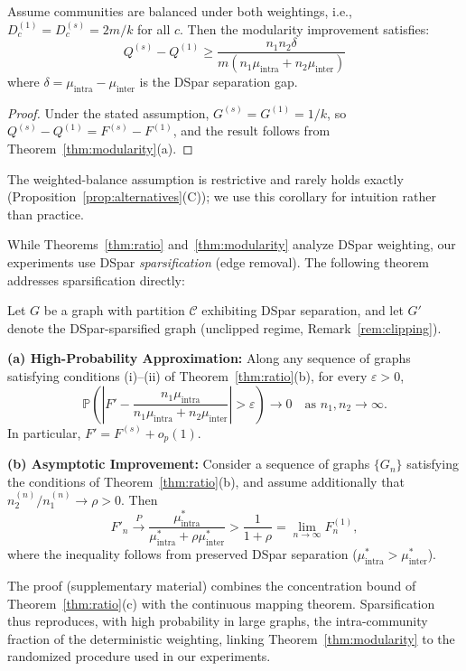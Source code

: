 \begin{corollary}
Assume communities are balanced under both weightings, i.e., $D_c^{(1)} = D_c^{(s)} = 2m/k$ for all $c$. Then the modularity improvement satisfies:
\begin{equation}
Q^{(s)} - Q^{(1)} \geq \frac{n_1 n_2 \delta}{m(n_1 \mu_{\text{intra}} + n_2 \mu_{\text{inter}})}
\end{equation}
where $\delta = \mu_{\text{intra}} - \mu_{\text{inter}}$ is the DSpar separation gap.
\end{corollary}

\begin{proof}
Under the stated assumption, $G^{(s)} = G^{(1)} = 1/k$, so $Q^{(s)} - Q^{(1)} = F^{(s)} - F^{(1)}$, and the result follows from Theorem~\ref{thm:modularity}(a).
\end{proof}

\noindent The weighted-balance assumption is restrictive and rarely holds exactly (Proposition~\ref{prop:alternatives}(C)); we use this corollary for intuition rather than practice.

While Theorems~\ref{thm:ratio} and~\ref{thm:modularity} analyze DSpar weighting, our experiments use DSpar \emph{sparsification} (edge removal). The following theorem addresses sparsification directly:

\begin{theorem}
\label{thm:sparsification}
Let $G$ be a graph with partition $\mathcal{C}$ exhibiting DSpar separation, and
let $G'$ denote the DSpar-sparsified graph (unclipped regime, Remark~\ref{rem:clipping}).

\textbf{(a) High-Probability Approximation:}
Along any sequence of graphs satisfying conditions (i)--(ii) of Theorem~\ref{thm:ratio}(b), for every $\varepsilon > 0$,
\begin{equation}
\mathbb{P}\!\left(
\left| F' -
\frac{n_1 \mu_{\text{intra}}}{n_1 \mu_{\text{intra}} + n_2 \mu_{\text{inter}}}
\right| > \varepsilon
\right) \longrightarrow 0 \quad \text{as } n_1, n_2 \to \infty.
\end{equation}
In particular, $F' = F^{(s)} + o_p(1)$.

\textbf{(b) Asymptotic Improvement:}
Consider a sequence of graphs $\{G_n\}$ satisfying the conditions of
Theorem~\ref{thm:ratio}(b), and assume additionally that
$n_2^{(n)}/n_1^{(n)} \to \rho > 0$. Then
\begin{equation}
F'_n \xrightarrow{P}
\frac{\mu_{\text{intra}}^*}{\mu_{\text{intra}}^* + \rho \mu_{\text{inter}}^*}
>
\frac{1}{1+\rho}
= \lim_{n \to \infty} F^{(1)}_n,
\end{equation}
where the inequality follows from preserved DSpar separation
($\mu_{\text{intra}}^* > \mu_{\text{inter}}^*$).
\end{theorem}

\noindent The proof (supplementary material) combines the concentration bound of Theorem~\ref{thm:ratio}(c) with the continuous mapping theorem.
Sparsification thus reproduces, with high probability in large graphs, the intra-community fraction of the deterministic weighting, linking Theorem~\ref{thm:modularity} to the randomized procedure used in our experiments.

